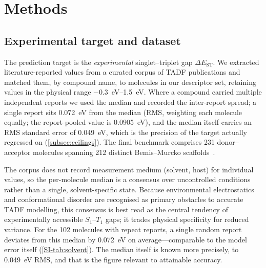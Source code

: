 
\section{Methods}\label{sec:methods}

\subsection{Experimental target and dataset}\label{para:validation_hierarchy}

The prediction target is the \emph{experimental} singlet--triplet gap
$\Delta E_\text{ST}$. We extracted literature-reported values from a curated
corpus of TADF publications and matched them, by compound name, to molecules in
our descriptor set, retaining values in the physical range
\qtyrange{-0.3}{1.5}{\electronvolt}. Where a compound carried multiple independent
reports we used the median and recorded the inter-report spread; a single report sits
\qty{0.072}{\electronvolt} from the median (RMS, weighting each molecule equally; the
report-pooled value is \qty{0.0905}{\electronvolt}), and the median itself carries an RMS
standard error of \qty{0.049}{\electronvolt}, which is the precision of the target
actually regressed on (\cref{subsec:ceilings}). The final benchmark comprises \num{231} donor--acceptor
molecules spanning \num{212} distinct Bemis--Murcko scaffolds~\cite{Bemis1996}.

The corpus does not record measurement medium (solvent, host) for individual
values, so the per-molecule median is a consensus over uncontrolled conditions
rather than a single, solvent-specific state. Because environmental electrostatics
and conformational disorder are recognised as primary obstacles to accurate TADF
modelling,\cite{Olivier2017} this consensus is best read as the central tendency of
experimentally accessible $S_1$--$T_1$ gaps; it trades physical specificity for
reduced variance. For the \num{102} molecules with repeat reports, a single random
report deviates from this median by \qty{0.072}{\electronvolt} on
average---comparable to the model error itself
(\cref{SI-tab:solvent}). The median itself is known more precisely, to
\qty{0.049}{\electronvolt} RMS, and that is the figure relevant to attainable accuracy.

